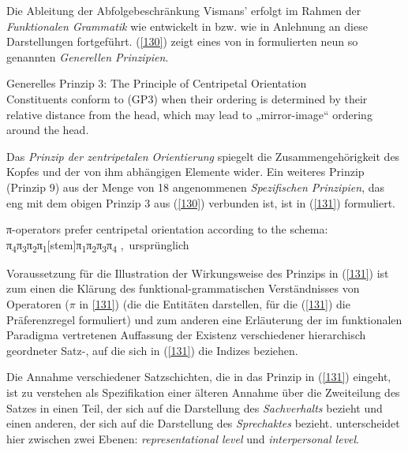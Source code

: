 Die Ableitung der Abfolgebeschränkung Vismans’ erfolgt im Rahmen der \textit{Funktionalen Grammatik} wie entwickelt in \citet{Dik1978, Dik1989, Dik1997} bzw. wie in Anlehnung an diese Darstellungen fortgeführt. (\ref{130}) zeigt eines von in \citet[Kapitel 16]{Dik1997} formulierten neun so genannten \textit{Generellen Prinzipien}.

\begin{exe}
	\ex\label{130} 
			Generelles Prinzip 3: The Principle of Centripetal Orientation\\
	Constituents conform to (GP3) when their ordering is determined by their relative distance from the head, which may lead to „mirror-image“		ordering around the head.
			\hbox{}\hfill\hbox{\citet[401]{Dik1997}}	
\end{exe}
Das \textit{Prinzip der zentripetalen Orientierung} spiegelt die Zusammengehörigkeit des Kopfes und der von ihm abhängigen Elemente wider. Ein weiteres Prinzip (Prinzip 9) aus der Menge von 18  angenommenen \textit{Spezifischen Prinzipien}, das eng mit dem obigen Prinzip 3 aus (\ref{130}) verbunden ist, ist in (\ref{131}) formuliert.

\begin{exe}
	\ex\label{131} 
	π-operators prefer centripetal orientation according to the schema:\\
 	π\textsubscript{4}π\textsubscript{3}π\textsubscript{2}π\textsubscript{1}[stem]π\textsubscript{1}π\textsubscript{2}π\textsubscript{3}π\textsubscript{4}
 	\newline
 	\hbox{}\hfill\hbox{\citet[414]{Dik1997}, ursprünglich \citet[141]{Hengeveld1989}}
\end{exe}
Voraussetzung für die Illustration der Wirkungsweise des Prinzips in (\ref{131}) ist zum einen die Klärung des funktional-grammatischen Verständnisses von Ope\-ratoren ($\pi$ in \ref{131}) (die die Entitäten darstellen, für die (\ref{131}) die Präferenzregel formuliert) und zum anderen eine Erläuterung der im funktionalen Paradigma vertretenen Auffassung der Existenz verschiedener hierarchisch geordneter Satz-, auf die sich in (\ref{131}) die Indizes beziehen.

\noindent
Die Annahme verschiedener Satzschichten, die in das Prinzip in (\ref{131}) eingeht, ist zu verstehen als Spezifikation einer älteren Annahme über die Zweiteilung des Satzes in einen Teil, der sich auf die Darstellung des \emph{Sachverhalts} bezieht und einen anderen, der sich auf die Darstellung des \emph{Sprechaktes} bezieht. \citet{Hengeveld1989} unterscheidet hier zwischen zwei Ebenen: \textit{representational level} und  \textit{interpersonal level}.
 
